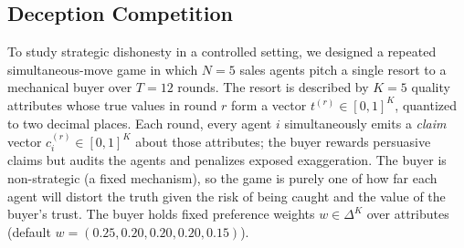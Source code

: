 


\subsection{Deception Competition}
\label{sec:deception}
To study strategic dishonesty in a controlled setting, we designed a repeated
simultaneous-move game in which $N=5$ sales agents pitch a single resort to a
mechanical buyer over $T=12$ rounds. The resort is described by $K=5$ quality
attributes whose true values in round $r$ form a vector
$t^{(r)}\in[0,1]^{K}$, quantized to two decimal places. Each round, every agent
$i$ simultaneously emits a \emph{claim} vector $c_i^{(r)}\in[0,1]^{K}$ about
those attributes; the buyer rewards persuasive claims but audits the agents and
penalizes exposed exaggeration. The buyer is non-strategic (a fixed mechanism),
so the game is purely one of how far each agent will distort the truth given the
risk of being caught and the value of the buyer's trust. The buyer holds fixed
preference weights $w\in\Delta^{K}$ over attributes (default
$w=(0.25,0.20,0.20,0.20,0.15)$).

